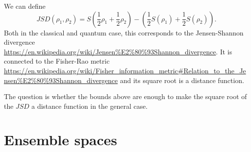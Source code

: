\begin{remark}
	We can define
	$$JSD(\rho_1, \rho_2) = S\left(\frac{1}{2}\rho_1 + \frac{1}{2} \rho_2\right) - \left(\frac{1}{2} S(\rho_1) + \frac{1}{2} S(\rho_2)\right).$$
	Both in the classical and quantum case, this corresponds to the Jensen-Shannon divergence \url{https://en.wikipedia.org/wiki/Jensen%E2%80%93Shannon_divergence}. It is connected to the Fisher-Rao metric \url{https://en.wikipedia.org/wiki/Fisher_information_metric#Relation_to_the_Jensen%E2%80%93Shannon_divergence} and its square root is a distance function.
	
	The question is whether the bounds above are enough to make the square root of the $JSD$ a distance function in the general case.
\end{remark}

\section{Ensemble spaces}

